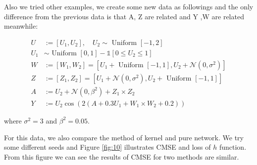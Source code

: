 \documentclass[11pt]{article}
\begin{document}

Also we tried other examples, we create some new data as followings and the only difference from the previous data is that A, Z are related and Y ,W are related meanwhile:

$$
\begin{aligned}
U &:=\left[U_{1}, U_{2}\right], \quad U_{2} \sim \text { Uniform }[-1,2] \\
U_{1} & \sim \text { Uniform }[0,1]-\mathbb{1}\left[0 \leq U_{2} \leq 1\right] \\
W &:=\left[W_{1}, W_{2}\right]=\left[U_{1}+\text { Uniform }[-1,1], U_{2}+\mathcal{N}\left(0, \sigma^{2}\right)\right] \\
Z &:=\left[Z_{1}, Z_{2}\right]=\left[U_{1}+\mathcal{N}\left(0, \sigma^{2}\right), U_{2}+\text { Uniform }[-1,1]\right] \\
A &:=U_{2}+\mathcal{N}\left(0, \beta^{2}\right)+Z_1\times Z_2 \\
Y &:=U_{2} \cos \left(2\left(A+0.3 U_{1}+W_1\times W_2+0.2\right)\right)
\end{aligned}
$$

where $\sigma^{2}=3$ and $\beta^{2}=0.05$.

For this data, we also compare the method of kernel and pure network. We try some different seeds and Figure \ref{fig:10} illustrates CMSE and loss of $h$ function. From this figure we can see the results of CMSE for two methods are similar.





\end{document}
